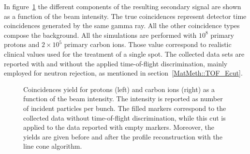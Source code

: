 In figure~\ref{fig:coincidences} the different components of the resulting secondary signal are shown as a function of the beam intensity. The true coincidences represent detector time coincidences generated by the same gamma ray. All the other coincidence types compose the background. All the simulations are performed with $10^{8}$ primary protons and  $2\times10^{5}$ primary carbon ions. Those value correspond to realistic clinical values used for the treatment of a single spot. The collected data sets are reported with and without the applied time-of-flight discrimination, mainly employed for neutron rejection, as mentioned in section~\ref{MatMeth::TOF_Ecut}.


\begin{figure} [!h]
  \caption{Coincidences yield for protons (left) and carbon ions (right) as a function of the beam intensity. The intensity is reported as number of incident particles per bunch. The filled markers correspond to the collected data without time-of-flight discrimination, while this cut is applied to the data reported with empty markers. Moreover, the yields are given before and after the profile reconstruction with the line cone algorithm.}
  \label{fig:coincidences}
\end{figure}

